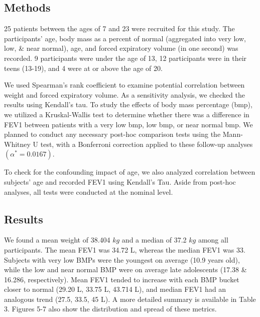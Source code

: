 \documentclass{article}
\begin{document}
		\subsection*{Methods}
		25 patients between the ages of 7 and 23 were recruited for this study. The participants’ age, body mass as a percent of normal (aggregated into very low, low, \& near normal), age, and forced expiratory volume (in one second) was recorded. 9 participants were under the age of 13, 12 participants were in their teens (13-19), and 4 were at or above the age of 20. 

		We used Spearman’s rank coefficient to examine potential correlation between weight and forced expiratory volume. As a sensitivity analysis, we checked the results using Kendall’s tau. To study the effects of body mass percentage (bmp), we utilized a Kruskal-Wallis test to determine whether there was a difference in FEV1 between patients with a very low bmp, low bmp, or near normal bmp. We planned to conduct any necessary post-hoc comparison tests using the Mann-Whitney U test, with a Bonferroni correction applied to these follow-up analyses $(\alpha^* = 0.0167)$. 

		To check for the confounding impact of age, we also analyzed correlation between subjects’ age and recorded FEV1 using Kendall’s Tau. Aside from post-hoc analyses, all tests were conducted at the nominal level.


		\subsection*{Results}
		We found a mean weight of 38.404 $kg$ and a median of 37.2 $kg$ among all participants. The mean FEV1 was 34.72 L, whereas the median FEV1 was 33. Subjects with very low BMPs were the youngest on average (10.9 years old), while the low and near normal BMP were on average late adolescents (17.38 \& 16.286, respectively). Mean FEV1 tended to increase with each BMP bucket closer to normal (29.20 L, 33.75 L, 43.714 L), and median FEV1 had an analogous trend (27.5, 33.5, 45 L). A more detailed summary is available in Table 3. Figures 5-7 also show the distribution and spread of these metrics.
\end{document}

